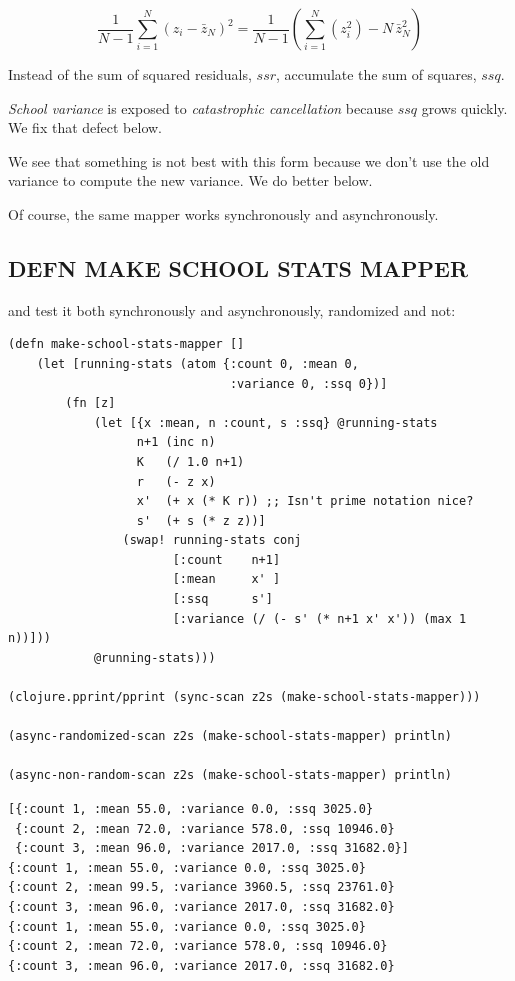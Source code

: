 \documentclass[10pt,oneside,x11names]{article}
\begin{document}
$$\frac{1}{N-1}\sum\limits_{i=1}^{N}\left({z_i-\bar{z}_N}\right)^2 =
\frac{1}{N-1}\left(\sum\limits_{i=1}^{N}\left(z_i^2\right)-N\,{\bar{z}_N^2}\right)$$

Instead of the sum of squared residuals, \(ssr\), accumulate the sum of
squares, \(ssq\).

\emph{School variance} is exposed to \emph{catastrophic cancellation} because
\(ssq\) grows quickly. We fix that defect below.

We see that something is not best with this form because we don't use
the old variance to compute the new variance. We do better below.

Of course, the same mapper works synchronously and asynchronously.

\subsection{DEFN MAKE SCHOOL STATS MAPPER}
\label{make-school-stats-mapper}
and test it both synchronously and asynchronously, randomized and not:

\begin{verbatim}
(defn make-school-stats-mapper []
    (let [running-stats (atom {:count 0, :mean 0,
                               :variance 0, :ssq 0})]
        (fn [z]
            (let [{x :mean, n :count, s :ssq} @running-stats
                  n+1 (inc n)
                  K   (/ 1.0 n+1)
                  r   (- z x)
                  x'  (+ x (* K r)) ;; Isn't prime notation nice?
                  s'  (+ s (* z z))]
                (swap! running-stats conj
                       [:count    n+1]
                       [:mean     x' ]
                       [:ssq      s']
                       [:variance (/ (- s' (* n+1 x' x')) (max 1 n))]))
            @running-stats)))

(clojure.pprint/pprint (sync-scan z2s (make-school-stats-mapper)))

(async-randomized-scan z2s (make-school-stats-mapper) println)

(async-non-random-scan z2s (make-school-stats-mapper) println)
\end{verbatim}

\begin{verbatim}
[{:count 1, :mean 55.0, :variance 0.0, :ssq 3025.0}
 {:count 2, :mean 72.0, :variance 578.0, :ssq 10946.0}
 {:count 3, :mean 96.0, :variance 2017.0, :ssq 31682.0}]
{:count 1, :mean 55.0, :variance 0.0, :ssq 3025.0}
{:count 2, :mean 99.5, :variance 3960.5, :ssq 23761.0}
{:count 3, :mean 96.0, :variance 2017.0, :ssq 31682.0}
{:count 1, :mean 55.0, :variance 0.0, :ssq 3025.0}
{:count 2, :mean 72.0, :variance 578.0, :ssq 10946.0}
{:count 3, :mean 96.0, :variance 2017.0, :ssq 31682.0}
\end{verbatim}
\end{document}
